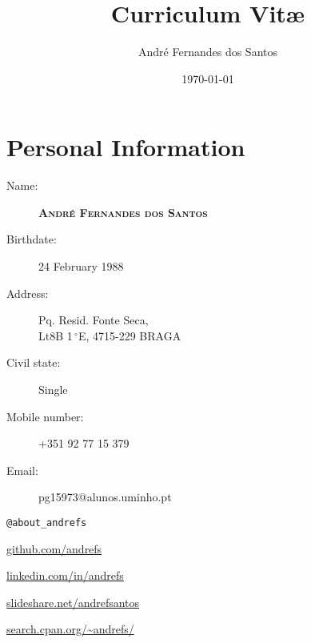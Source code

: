 \documentclass{article}
\author{André Fernandes dos Santos}
\title{Curriculum Vit\ae}
\date{\today}
\begin{document}
\maketitle

\section{Personal Information}
	\begin{description}
	\item [Name:] \large\textbf{\textsc{André Fernandes dos Santos}}
	\end{description}
\begin{multicols}{2}
	\begin{description}
	\item [Birthdate:] 24 February 1988
	\item [Address:] Pq. Resid. Fonte Seca,\\Lt8B 1$\,^{\circ}$E, 4715-229 BRAGA
	\item [Civil state:] Single
	\item [Mobile number:] +351 92 77 15 379
	\item [Email:] pg15973@alunos.uminho.pt
	\end{description}
	\vfill

	\columnbreak

	\begin{description}
		\small
		\item [Twitter:] \texttt{@about\_andrefs} 
		\item [GitHub:] \url{github.com/andrefs} 
		\item [LinkedIn:] \url{linkedin.com/in/andrefs}
		\item [SlideShare:] \url{slideshare.net/andrefsantos}
		\item [CPAN:] \url{search.cpan.org/~andrefs/}
	\end{description}
	\vspace*{\fill}
\end{multicols}
\end{document}
